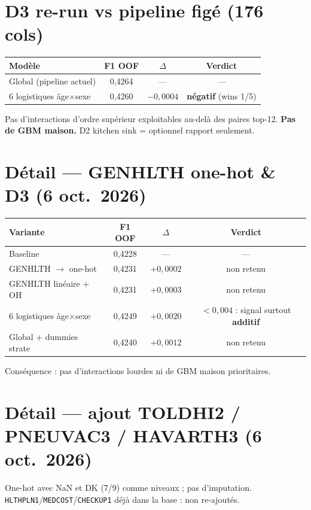 \documentclass[11pt,a4paper]{article}
\begin{document}
\section{D3 re-run vs pipeline figé (176 cols)}
\begin{center}
\begin{tabular}{@{}lccc@{}}
\toprule
Modèle & F1 OOF & $\Delta$ & Verdict \\
\midrule
Global (pipeline actuel) & 0{,}4264 & --- & --- \\
6 logistiques âge$\times$sexe & 0{,}4260 & $-0{,}0004$ & \textbf{négatif} (wins 1/5) \\
\bottomrule
\end{tabular}
\end{center}
\noindent Pas d'interactions d'ordre supérieur exploitables au-delà des paires top-12.
\textbf{Pas de GBM maison.} D2 kitchen sink = optionnel rapport seulement.

\section{Détail --- GENHLTH one-hot \& D3 (6 oct.\ 2026)}
\begin{center}
\begin{tabular}{@{}lccc@{}}
\toprule
Variante & F1 OOF & $\Delta$ & Verdict \\
\midrule
Baseline & 0{,}4228 & --- & --- \\
GENHLTH $\to$ one-hot & 0{,}4231 & $+0{,}0002$ & non retenu \\
GENHLTH linéaire + OH & 0{,}4231 & $+0{,}0003$ & non retenu \\
6 logistiques âge$\times$sexe & 0{,}4249 & $+0{,}0020$ & $<0{,}004$ : signal surtout \textbf{additif} \\
Global + dummies strate & 0{,}4240 & $+0{,}0012$ & non retenu \\
\bottomrule
\end{tabular}
\end{center}
\noindent Conséquence : pas d'interactions lourdes ni de GBM maison prioritaires.

\section{Détail --- ajout TOLDHI2 / PNEUVAC3 / HAVARTH3 (6 oct.\ 2026)}
One-hot avec NaN et DK (7/9) comme niveaux ; pas d'imputation.
\texttt{HLTHPLN1}/\texttt{MEDCOST}/\texttt{CHECKUP1} déjà dans la base : non re-ajoutés.
\end{document}
